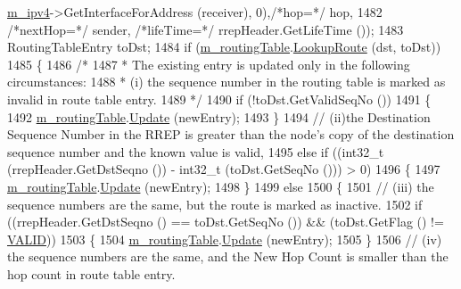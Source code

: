 \begin{DoxyCode}
      \hyperlink{classns3_1_1aodv_1_1RoutingProtocol_aee33006b1f9d8b24d4722037ff3fec98}{m\_ipv4}->GetInterfaceForAddress (receiver), 0),\textcolor{comment}{/*hop=*/} hop,
1482                                           \textcolor{comment}{/*nextHop=*/} sender, \textcolor{comment}{/*lifeTime=*/} rrepHeader.GetLifeTime ());
1483   RoutingTableEntry toDst;
1484   \textcolor{keywordflow}{if} (\hyperlink{classns3_1_1aodv_1_1RoutingProtocol_a4e1003a34c8adc96db71096d88c98ae0}{m\_routingTable}.\hyperlink{classns3_1_1aodv_1_1RoutingTable_a90cbc8a2c65cd68ccdaf768fcbb5d723}{LookupRoute} (dst, toDst))
1485     \{
1486       \textcolor{comment}{/*}
1487 \textcolor{comment}{       * The existing entry is updated only in the following circumstances:}
1488 \textcolor{comment}{       * (i) the sequence number in the routing table is marked as invalid in route table entry.}
1489 \textcolor{comment}{       */}
1490       \textcolor{keywordflow}{if} (!toDst.GetValidSeqNo ())
1491         \{
1492           \hyperlink{classns3_1_1aodv_1_1RoutingProtocol_a4e1003a34c8adc96db71096d88c98ae0}{m\_routingTable}.\hyperlink{classns3_1_1aodv_1_1RoutingTable_a39fb5335110164f4c1b97682a3812dc1}{Update} (newEntry);
1493         \}
1494       \textcolor{comment}{// (ii)the Destination Sequence Number in the RREP is greater than the node's copy of the destination
       sequence number and the known value is valid,}
1495       \textcolor{keywordflow}{else} \textcolor{keywordflow}{if} ((int32\_t (rrepHeader.GetDstSeqno ()) - int32\_t (toDst.GetSeqNo ())) > 0)
1496         \{
1497           \hyperlink{classns3_1_1aodv_1_1RoutingProtocol_a4e1003a34c8adc96db71096d88c98ae0}{m\_routingTable}.\hyperlink{classns3_1_1aodv_1_1RoutingTable_a39fb5335110164f4c1b97682a3812dc1}{Update} (newEntry);
1498         \}
1499       \textcolor{keywordflow}{else}
1500         \{
1501           \textcolor{comment}{// (iii) the sequence numbers are the same, but the route is marked as inactive.}
1502           \textcolor{keywordflow}{if} ((rrepHeader.GetDstSeqno () == toDst.GetSeqNo ()) && (toDst.GetFlag () != 
      \hyperlink{group__aodv_gga44216921a9c725a5ab8bc19059052a26af5fecee96bb2650aa417994840b43c99}{VALID}))
1503             \{
1504               \hyperlink{classns3_1_1aodv_1_1RoutingProtocol_a4e1003a34c8adc96db71096d88c98ae0}{m\_routingTable}.\hyperlink{classns3_1_1aodv_1_1RoutingTable_a39fb5335110164f4c1b97682a3812dc1}{Update} (newEntry);
1505             \}
1506           \textcolor{comment}{// (iv)  the sequence numbers are the same, and the New Hop Count is smaller than the hop count
       in route table entry.}

\end{DoxyCode}
